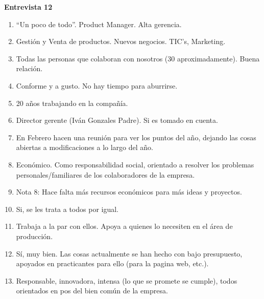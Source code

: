 \newpage
\textbf{Entrevista 12}\\
\begin{enumerate}
	\item ``Un poco de todo''. Product Manager. Alta gerencia.
	\item  Gestión y Venta de productos. Nuevos negocios. TIC's, Marketing.
	\item Todas las personas que colaboran con nosotros (30 aproximadamente). Buena relación.
	\item Conforme y a gusto. No hay tiempo para aburrirse.
	\item 20 años trabajando en la compañía.
	\item Director gerente (Iván Gonzales Padre). Si es tomado en cuenta.
	\item En Febrero hacen una reunión para ver los puntos del año, dejando las cosas abiertas a
		modificaciones a lo largo del año.
	\item Económico. Como responsabilidad social, orientado a resolver los problemas
		personales/familiares de los colaboradores de la empresa.
	\item Nota 8: Hace falta más recursos económicos para más ideas y proyectos.
	\item Si, se les trata a todos por igual.
	\item Trabaja a la par con ellos. Apoya a quienes lo necesiten en el área de producción.
	\item Sí, muy bien. Las cosas actualmente se han hecho con bajo presupuesto, apoyados en
		practicantes para ello (para la pagina web, etc.).
	\item Responsable, innovadora, intensa (lo que se promete se cumple), todos orientados en pos del
		bien común de la empresa.
\end{enumerate}
